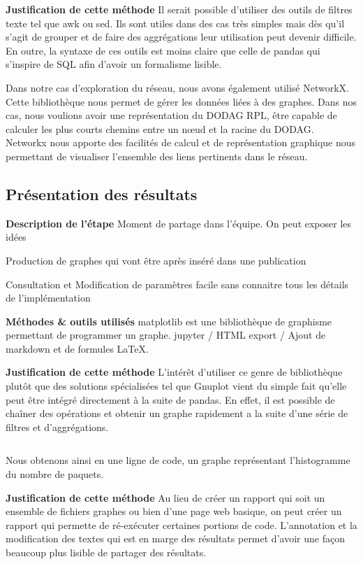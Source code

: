 \inputminted{python}{snippets/pandas.py}

\textbf{Justification de cette méthode} Il serait possible d'utiliser des
outils de filtres texte tel que awk ou sed. Ils sont utiles dans des cas très
simples mais dès qu'il s'agit de grouper et de faire des aggrégations leur
utilisation peut devenir difficile. En outre, la syntaxe de ces outils est
moins claire que celle de pandas qui s'inspire de \ac{SQL} afin d'avoir un
formalisme lisible.

Dans notre cas d'exploration du réseau, nous avons également utilisé NetworkX.
Cette bibliothèque nous permet de gérer les données liées à des graphes. Dans
nos cas, nous voulions avoir une représentation du \ac{DODAG} \ac{RPL}, être
capable de calculer les plus courts chemins entre un nœud et la racine du
\ac{DODAG}. Networkx nous apporte des facilités de calcul et de représentation
graphique nous permettant de visualiser l'ensemble des liens pertinents dans
le réseau.

\subsection{Présentation des résultats}

\textbf{Description de l'étape} Moment de partage dans l'équipe. On peut
exposer les idées

Production de graphes qui vont être après inséré dans une publication

Consultation et Modification de paramètres facile sans connaitre tous les
détails de l'implémentation

\textbf{Méthodes \& outils utilisés} matplotlib \cite{Hunter:2007} est une
bibliothèque de graphisme permettant de programmer un graphe.
jupyter  / HTML export / Ajout de markdown et de formules \LaTeX{}.

\textbf{Justification de cette méthode}  L'intérêt d'utiliser ce genre de
bibliothèque plutôt que des solutions spécialisées tel que Gnuplot
\cite{Gnuplot_4.4} vient du simple fait qu'elle peut être intégré directement
à la suite de pandas. En effet, il est possible de chaîner des opérations et
obtenir un graphe rapidement a la suite d'une série de filtres et
d'aggrégations.

\inputminted{python}{snippets/matplotlib.py}

Nous obtenons ainsi en une ligne de code, un graphe représentant l'histogramme
du nombre de paquets.

\textbf{Justification de cette méthode} Au lieu de créer un rapport qui soit un
ensemble de fichiers graphes ou bien d'une page web basique, on peut créer un
rapport qui permette de ré-exécuter certaines portions de code. L'annotation et
la modification des textes qui est en marge des résultats permet d'avoir une
façon beaucoup plus lisible de partager des résultats.

